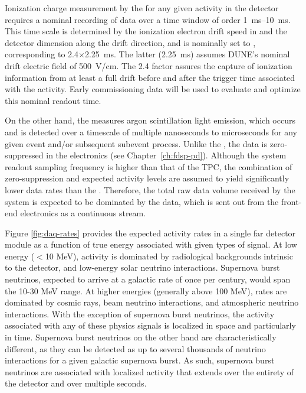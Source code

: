 Ionization charge measurement by the  for any given activity in the detector requires a nominal recording of data over a time window of order \SIrange{1}{10}{\milli\second}. 
This time scale is determined by the ionization electron drift speed in \lar and the detector dimension along the drift direction, and is nominally set to \spreadout, corresponding to 2.4$\times$\SI{2.25}{\milli\second}.
The latter (\SI{2.25}{\milli\second}) assumes DUNE's nominal drift electric field of 500~V/cm.
The 2.4 factor assures the capture of ionization information from at
least a full drift before and after the trigger time associated with the
activity. Early commissioning data will be used to evaluate and optimize this nominal readout time.

On the other hand, the  measures argon scintillation light emission, which
occurs and is detected over a timescale of multiple nanoseconds to
microseconds for
any given event and/or subsequent subevent process. Unlike the ,
the  data is zero-suppressed in
the  electronics (see Chapter~\ref{ch:fdsp-pd}). Although
the  system readout sampling frequency is higher than that
of the TPC, the combination of zero-suppression and expected activity
levels are assumed to yield significantly lower data rates than the . Therefore, the total raw data volume received by
the  system is expected to be dominated by
the  data, which is sent out from the front-end electronics as a continuous stream.
 
Figure \ref{fig:daq-rates} provides the expected activity rates in a
single far detector module as a function of true energy associated
with given types of signal.
At low energy ($<$10 MeV), activity is dominated by radiological backgrounds
intrinsic to the detector, and
low-energy solar neutrino interactions. Supernova burst neutrinos,
expected to arrive at a galactic  rate of once per century, 
would span the 10-30 MeV range. At higher energies (generally
above 100 MeV), rates are dominated by cosmic rays, beam neutrino interactions,
and atmospheric neutrino interactions. With the exception of supernova
burst neutrinos, the activity associated with any of these physics
signals is localized in space and particularly in time. Supernova burst
neutrinos on the other hand are characteristically different, as they
can be detected as up to several thousands of neutrino interactions
for a given galactic supernova burst. As such, supernova burst neutrinos
are associated with localized activity that extends over the entirety of the
detector and over multiple seconds. %

